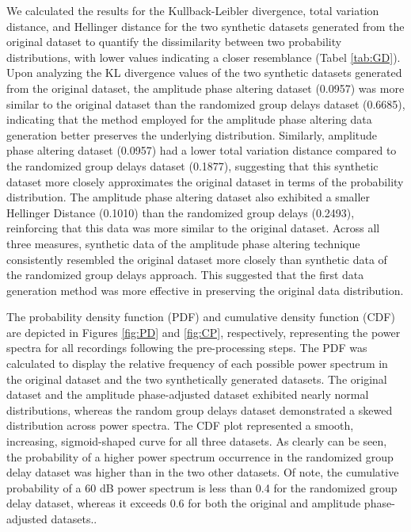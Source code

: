 \documentclass{article}
\begin{document}
We calculated the results for the Kullback-Leibler divergence, total variation distance, and Hellinger distance for the two synthetic datasets generated from the original dataset to quantify the dissimilarity between two probability distributions, with lower values indicating a closer resemblance (Tabel \ref {tab:GD}). Upon analyzing the KL divergence values of the two synthetic datasets generated from the original dataset, the amplitude phase altering dataset (0.0957) was more similar to the original dataset than the randomized group delays dataset (0.6685), indicating that the method employed for the amplitude phase altering data generation better preserves the underlying distribution. Similarly, amplitude phase altering dataset (0.0957) had a lower total variation distance compared to the randomized group delays dataset (0.1877), suggesting that this synthetic dataset more closely approximates the original dataset in terms of the probability distribution. The amplitude phase altering dataset also exhibited a smaller Hellinger Distance (0.1010) than the randomized group delays (0.2493), reinforcing that this data was more similar to the original dataset. Across all three measures, synthetic data of the amplitude phase altering technique consistently resembled the original dataset more closely than synthetic data of the randomized group delays approach. This suggested that the first data generation method was more effective in preserving the original data distribution.

\par The probability density function (PDF) and cumulative density function (CDF) are depicted in Figures \ref{fig:PD} and \ref{fig:CP}, respectively, representing the power spectra for all recordings following the pre-processing steps. The PDF was calculated to display the relative frequency of each possible power spectrum in the original dataset and the two synthetically generated datasets. The original dataset and the amplitude phase-adjusted dataset exhibited nearly normal distributions, whereas the random group delays dataset demonstrated a skewed distribution across power spectra. The CDF plot represented a smooth, increasing, sigmoid-shaped curve for all three datasets. As clearly can be seen, the probability of a higher power spectrum occurrence in the randomized group delay dataset was higher than in the two other datasets. Of note, the cumulative probability of a 60 dB power spectrum is less than 0.4 for the randomized group delay dataset, whereas it exceeds 0.6 for both the original and amplitude phase-adjusted datasets..
\end{document}
